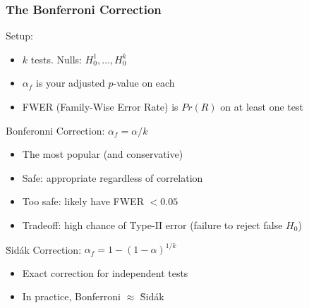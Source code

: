 \begin{frame}
\frametitle{The Bonferroni Correction}
Setup:
\begin{itemize}
    \item $k$ tests. Nulls: $H_0^1,\ldots,H_0^k$
    \item $\alpha_f$ is your adjusted $p$-value on each
    \item FWER (Family-Wise Error Rate) is $Pr(R)$ on at least one test
\end{itemize}
Bonferonni Correction: $\alpha_f = \alpha/k$
\begin{itemize}
    \item The most popular (and conservative)
    \item Safe: appropriate regardless of correlation
    \item Too safe: likely have FWER $< 0.05$
    \item Tradeoff: high chance of Type-II error (failure to reject false $H_0$)
\end{itemize}
\u{S}id\'{a}k Correction: $\alpha_f = 1-(1-\alpha)^{1/k}$
\begin{itemize}
    \item Exact correction for independent tests
    \item In practice, Bonferroni $\approx$ \u{S}id\'{a}k
\end{itemize}
\end{frame}


